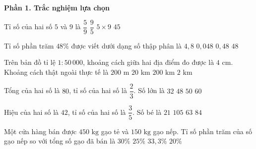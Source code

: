 \textbf{Phần 1. Trắc nghiệm lựa chọn}

\begin{ex} %
Tỉ số của hai số $5$ và $9$ là
\choice
{\True $\dfrac{5}{9}$}
{$\dfrac{9}{5}$}
{$5 \times 9$}
{$45$}
\end{ex}

\begin{ex} %
Tỉ số phần trăm $48\%$ được viết dưới dạng số thập phân là
\choice
{$4{,}8$}
{$0{,}048$}
{\True $0{,}48$}
{$48$}
\end{ex}

\begin{ex} %
Trên bản đồ tỉ lệ $1 : 50\,000$, khoảng cách giữa hai địa điểm đo được là $4\text{ cm}$. Khoảng cách thật ngoài thực tế là
\choice
{$200\text{ m}$}
{$20\text{ km}$}
{$200\text{ km}$}
{\True $2\text{ km}$}
\end{ex}

\begin{ex} %
Tổng của hai số là $80$, tỉ số của hai số là $\dfrac{2}{3}$. Số lớn là
\choice
{$32$}
{\True $48$}
{$50$}
{$60$}
\end{ex}

\begin{ex} %
Hiệu của hai số là $42$, tỉ số của hai số là $\dfrac{3}{5}$. Số bé là
\choice
{$21$}
{$105$}
{\True $63$}
{$84$}
\end{ex}

\begin{ex} %
Một cửa hàng bán được $450\text{ kg}$ gạo tẻ và $150\text{ kg}$ gạo nếp. Tỉ số phần trăm của số gạo nếp so với tổng số gạo đã bán là
\choice
{$30\%$}
{\True $25\%$}
{$33{,}3\%$}
{$20\%$}
\end{ex}

